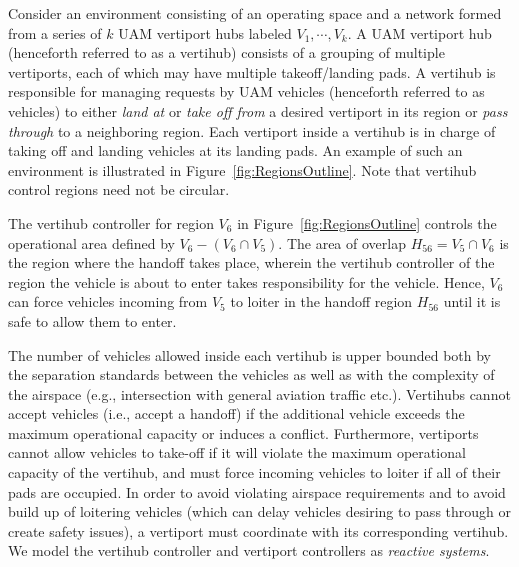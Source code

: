  Consider an environment consisting of an operating space and a network formed from a series of $k$ UAM vertiport hubs labeled $V_1,\cdots,V_k$. A UAM vertiport hub (henceforth referred to as a vertihub) consists of a grouping of multiple vertiports, each of which may have multiple takeoff/landing pads. A vertihub is responsible for managing requests by UAM vehicles (henceforth referred to as vehicles) to either \emph{land at} or \emph{take off from} a desired vertiport in its region or \emph{pass through} to a neighboring region. Each vertiport inside a vertihub is in charge of taking off and landing vehicles at its landing pads. An example of such an environment is illustrated in Figure~\ref{fig:RegionsOutline}. Note that vertihub control regions need not be circular. 
\begin{eg}
The vertihub controller for region $V_6$ in Figure~\ref{fig:RegionsOutline} controls the operational area defined by $V_6 - (V_6 \cap V_5)$. The area of overlap $H_{56} = V_5 \cap V_6$ is the region where the handoff takes place, wherein the vertihub controller of the region the vehicle is about to enter takes responsibility for the vehicle.
Hence, $V_6$ can force vehicles incoming from $V_5$ to loiter in the handoff region $H_{56}$ until it is safe to allow them to enter.
\end{eg}

The number of vehicles allowed inside each vertihub is upper bounded both by the separation standards between the vehicles as well as with the complexity of the airspace (e.g., intersection with general aviation traffic etc.).
Vertihubs cannot accept vehicles (i.e., accept a handoff) if the additional vehicle exceeds the maximum operational capacity or induces a conflict. Furthermore, vertiports cannot allow vehicles to take-off if it will violate the maximum operational capacity of the vertihub, and must force incoming vehicles to loiter if all of their pads are occupied. In order to avoid violating airspace requirements and to avoid build up of loitering vehicles (which can delay vehicles desiring to pass through or create safety issues), a vertiport must coordinate with its corresponding vertihub. We model the vertihub controller and vertiport controllers as \emph{reactive systems}.

